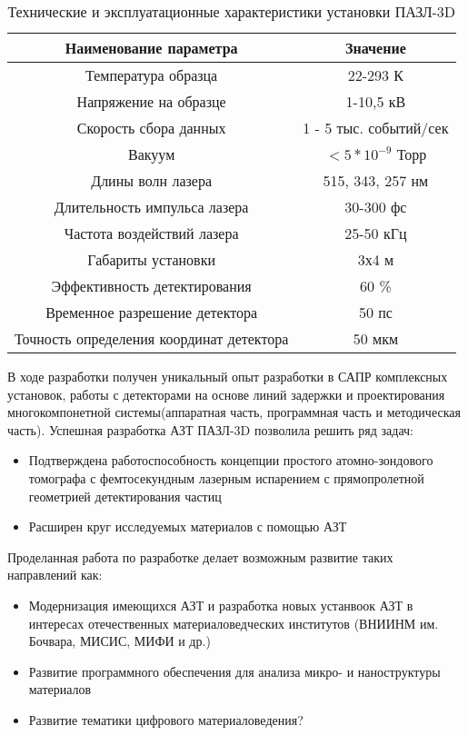 \begin{table} [htbp]
	\centering
	\caption{Технические и эксплуатационные характеристики установки ПАЗЛ-3D}
	\label{tab:APPLEcharac}
	\begin{SingleSpace}
		\begin{tabular} {| c | c |}
			\hline
			Наименование параметра & Значение  \\ \hline
			Температура образца & 22-293 К                \\ \hline
			Напряжение на образце & 1-10,5 кВ               \\ \hline
			Скорость сбора данных & 1 - 5 тыс. событий/сек                \\ \hline
			Вакуум & $<5*10^{-9}$ Торр                \\ \hline
			Длины волн лазера & 515, 343, 257 нм               \\ \hline
			Длительность импульса лазера & 30-300 фс               \\ \hline
			Частота воздействий лазера & 25-50 кГц                \\ \hline
			Габариты установки & 3х4 м               \\ \hline
			Эффективность детектирования & 60 \%              \\ \hline
			Временное разрешение детектора & 50 пс               \\ \hline
			Точность определения координат детектора  & 50 мкм               \\ \hline
		\end{tabular}
	\end{SingleSpace}
\end{table}
В ходе разработки получен уникальный опыт разработки в САПР комплексных установок,  работы с детекторами на основе линий задержки и проектирования многокомпонетной системы(аппаратная часть, программная часть и методическая часть). Успешная разработка АЗТ ПАЗЛ-3D позволила решить ряд задач:

\begin{itemize}
	\item Подтверждена работоспособность концепции простого атомно-зондового томографа с фемтосекундным лазерным испарением с прямопролетной геометрией детектирования частиц
	\item Расширен круг исследуемых материалов с помощью АЗТ
\end{itemize}

Проделанная работа по разработке делает возможным развитие таких направлений как:
\begin{itemize}
	\item Модернизация имеющихся АЗТ и разработка новых устанвоок АЗТ в интересах отечественных материаловедческих институтов (ВНИИНМ им. Бочвара, МИСИС, МИФИ  и др.)
	\item Развитие программного обеспечения для анализа микро- и наноструктуры материалов
	\item Развитие тематики цифрового материаловедения?
\end{itemize}

\FloatBarrier







